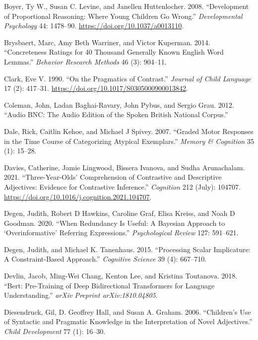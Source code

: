 \documentclass{ucetd}
\newlength{\cslhangindent}
\newenvironment{cslreferences}%
{\setlength{\parindent}{0pt}%
\everypar{\setlength{\hangindent}{\cslhangindent}}\ignorespaces}%
{\par}
\begin{document}
\begin{cslreferences}
\leavevmode\hypertarget{ref-boyer_development_2008}{}%
Boyer, Ty W., Susan C. Levine, and Janellen Huttenlocher. 2008.
``Development of Proportional Reasoning: Where Young Children Go
Wrong.'' \emph{Developmental Psychology} 44: 1478--90.
\url{https://doi.org/10.1037/a0013110}.

\leavevmode\hypertarget{ref-brysbaert2014}{}%
Brysbaert, Marc, Amy Beth Warriner, and Victor Kuperman. 2014.
``Concreteness Ratings for 40 Thousand Generally Known English Word
Lemmas.'' \emph{Behavior Research Methods} 46 (3): 904--11.

\leavevmode\hypertarget{ref-clark_pragmatics_1990}{}%
Clark, Eve V. 1990. ``On the Pragmatics of Contrast.'' \emph{Journal of
Child Language} 17 (2): 417--31.
\url{https://doi.org/10.1017/S0305000900013842}.

\leavevmode\hypertarget{ref-coleman_audio_2012}{}%
Coleman, John, Ladan Baghai-Ravary, John Pybus, and Sergio Grau. 2012.
``Audio BNC: The Audio Edition of the Spoken British National Corpus.''

\leavevmode\hypertarget{ref-dale_graded_2007}{}%
Dale, Rick, Caitlin Kehoe, and Michael J Spivey. 2007. ``Graded Motor
Responses in the Time Course of Categorizing Atypical Exemplars.''
\emph{Memory \& Cognition} 35 (1): 15--28.

\leavevmode\hypertarget{ref-davies_three-year-olds_2021}{}%
Davies, Catherine, Jamie Lingwood, Bissera Ivanova, and Sudha
Arunachalam. 2021. ``Three-Year-Olds' Comprehension of Contrastive and
Descriptive Adjectives: Evidence for Contrastive Inference.''
\emph{Cognition} 212 (July): 104707.
\url{https://doi.org/10.1016/j.cognition.2021.104707}.

\leavevmode\hypertarget{ref-degen_when_2020}{}%
Degen, Judith, Robert D Hawkins, Caroline Graf, Elisa Kreiss, and Noah D
Goodman. 2020. ``When Redundancy Is Useful: A Bayesian Approach to
`Overinformative' Referring Expressions.'' \emph{Psychological Review}
127: 591--621.

\leavevmode\hypertarget{ref-degen_processing_2015}{}%
Degen, Judith, and Michael K. Tanenhaus. 2015. ``Processing Scalar
Implicature: A Constraint-Based Approach.'' \emph{Cognitive Science} 39
(4): 667--710.

\leavevmode\hypertarget{ref-devlin2018}{}%
Devlin, Jacob, Ming-Wei Chang, Kenton Lee, and Kristina Toutanova. 2018.
``Bert: Pre-Training of Deep Bidirectional Transformers for Language
Understanding.'' \emph{arXiv Preprint arXiv:1810.04805}.

\leavevmode\hypertarget{ref-diesendruck_childrens_2006}{}%
Diesendruck, Gil, D. Geoffrey Hall, and Susan A. Graham. 2006.
``Children's Use of Syntactic and Pragmatic Knowledge in the
Interpretation of Novel Adjectives.'' \emph{Child Development} 77 (1):
16--30.


\end{cslreferences}
\end{document}
